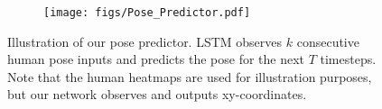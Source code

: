 \documentclass{article}
\newcommand{\cutsubsectionup}{\vspace*{-0.09in}}
\newcommand{\cutsubsectiondown}{\vspace*{-0.04in}}
\newcommand{\cutsubsectionup}{}
\newcommand{\cutsubsectiondown}{}
\begin{document}
\begin{figure}[t]
    \begin{subfigure}{1\linewidth}
	    \texttt{[image: figs/Pose\_Predictor.pdf]}
	\end{subfigure} 
\caption{Illustration of our pose predictor. LSTM observes $k$ consecutive human pose inputs and predicts the pose for the next $T$ timesteps. Note that the human heatmaps are used for illustration purposes, but our network observes and outputs xy-coordinates.}
\label{fig:pose_predictor}
\vspace{-0.3in}
\end{figure}%
\end{document}

